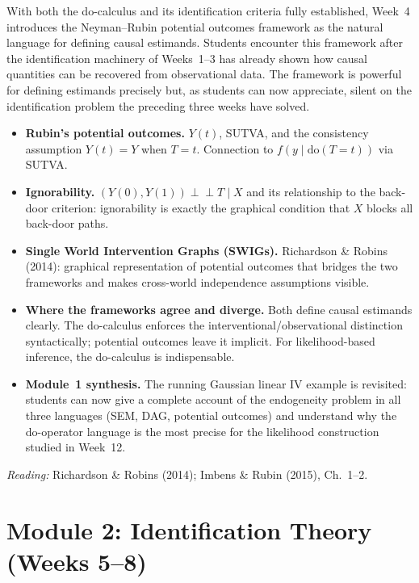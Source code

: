 \documentclass[12pt]{article}
\begin{document}
With both the do-calculus and its identification criteria fully established,
Week~4 introduces the Neyman--Rubin potential outcomes framework as the
natural language for defining causal estimands. Students encounter this
framework after the identification machinery of Weeks~1--3 has already
shown how causal quantities can be recovered from observational data.
The framework is powerful for defining estimands precisely but, as
students can now appreciate, silent on the identification problem the
preceding three weeks have solved.

\begin{itemize}
  \item \textbf{Rubin's potential outcomes.}
    $Y(t)$, SUTVA, and the consistency assumption $Y(t) = Y$ when $T = t$.
    Connection to $f(y \mid \mathrm{do}(T{=}t))$ via SUTVA.

  \item \textbf{Ignorability.}
    $(Y(0), Y(1)) \perp\!\!\!\perp T \mid X$ and its relationship to the
    back-door criterion: ignorability is exactly the graphical condition
    that $X$ blocks all back-door paths.

  \item \textbf{Single World Intervention Graphs (SWIGs).}
    Richardson \& Robins (2014): graphical representation of potential
    outcomes that bridges the two frameworks and makes
    cross-world independence assumptions visible.

  \item \textbf{Where the frameworks agree and diverge.}
    Both define causal estimands clearly. The do-calculus enforces the
    interventional/observational distinction syntactically; potential
    outcomes leave it implicit. For likelihood-based inference, the
    do-calculus is indispensable.

  \item \textbf{Module~1 synthesis.}
    The running Gaussian linear IV example is revisited: students can
    now give a complete account of the endogeneity problem in all three
    languages (SEM, DAG, potential outcomes) and understand why the
    do-operator language is the most precise for the likelihood
    construction studied in Week~12.
\end{itemize}

\noindent\textit{Reading:} Richardson \& Robins (2014);
Imbens \& Rubin (2015), Ch.~1--2.

\section{Module 2: Identification Theory (Weeks 5--8)}
\end{document}
